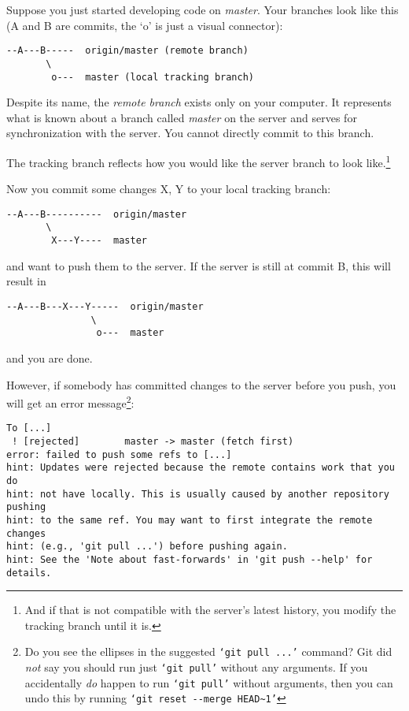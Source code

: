 \documentclass[12pt,pdftex]{article}
\begin{document}
Suppose you just started developing code on \emph{master}.
Your branches look like this (A and B are commits, the `o' is just
a visual connector):
\begin{verbatim}
--A---B-----  origin/master (remote branch)
       \
        o---  master (local tracking branch)
\end{verbatim}


\bigskip

Despite its name, the \emph{remote branch} exists only on your computer.
It represents what is known about a branch called \emph{master} on the
server and serves for synchronization with the server.
You cannot directly commit to this branch.

The tracking branch reflects how you would like the server branch to
look like.\footnote{And if that is not compatible with the server's latest history, you
modify the tracking branch until it is.}


\bigskip


Now you commit some changes X, Y to your local tracking branch:
\begin{verbatim}
--A---B----------  origin/master
       \
        X---Y----  master
\end{verbatim}
and want to push them to the server.
If the server is still at commit B, this will result in
\begin{verbatim}
--A---B---X---Y-----  origin/master
               \
                o---  master
\end{verbatim}
and you are done.

However, if somebody has committed changes to the server before you
push, you will get an error message\footnote{Do you see the ellipses in the suggested \texttt{‘git pull ...’} command?
Git did \emph{not} say you should run just \texttt{‘git pull’} without any arguments.
If you accidentally \emph{do} happen to run \texttt{‘git pull’} without arguments,
then you can undo this by running  \texttt{‘git reset -{}-merge HEAD\textasciitilde{}1’}}:

{\small
\begin{verbatim}
To [...]
 ! [rejected]        master -> master (fetch first)
error: failed to push some refs to [...]
hint: Updates were rejected because the remote contains work that you do
hint: not have locally. This is usually caused by another repository pushing
hint: to the same ref. You may want to first integrate the remote changes
hint: (e.g., 'git pull ...') before pushing again.
hint: See the 'Note about fast-forwards' in 'git push --help' for details.
\end{verbatim}
}
\end{document}
